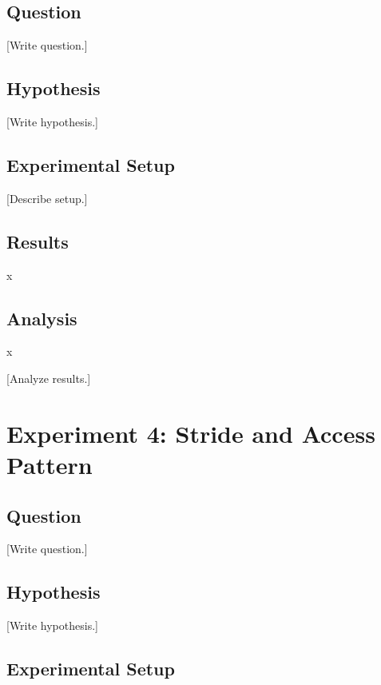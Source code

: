 \documentclass[11pt]{article}
\begin{document}
\subsection{Question}
[Write question.]

\subsection{Hypothesis}
[Write hypothesis.]

\subsection{Experimental Setup}


[Describe setup.]

\subsection{Results}
x

\subsection{Analysis}
x
%

[Analyze results.]

\section{Experiment 4: Stride and Access Pattern}

\subsection{Question}
[Write question.]

\subsection{Hypothesis}
[Write hypothesis.]

\subsection{Experimental Setup}
\end{document}
